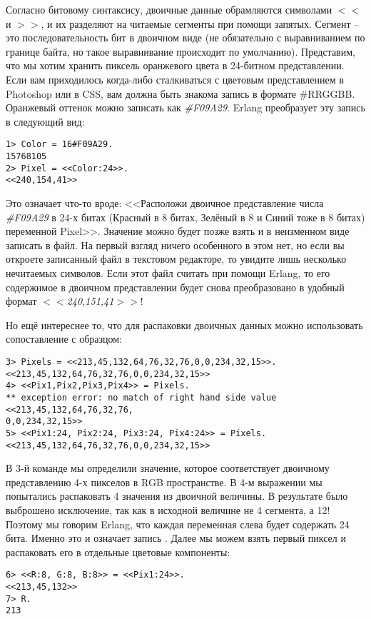 Согласно битовому синтаксису, двоичные данные обрамляются символами $<<$ и $>>$, и их разделяют на читаемые сегменты при помощи запятых. Сегмент \--- это последовательность бит в двоичном виде (не обязательно с выравниванием по границе байта, но такое выравнивание происходит по умолчанию). Представим, что мы хотим хранить пиксель оранжевого цвета в 24\--битном представлении. Если вам приходилось когда\--либо сталкиваться с цветовым представлением в Photoshop или в CSS, вам должна быть знакома запись в формате \#RRGGBB. Оранжевый оттенок можно записать как \emph{\#F09A29}. Erlang преобразует эту запись в следующий вид:
\begin{lstlisting}[style=repl]
1> Color = 16#F09A29.
15768105
2> Pixel = <<Color:24>>.
<<240,154,41>>
\end{lstlisting}

Это означает что\--то вроде: <<Расположи двоичное представление числа \emph{\#F09A29} в 24\--х битах (Красный в 8 битах, Зелёный в 8 и Синий тоже в 8 битах) переменной Pixel>>. Значение можно будет позже взять и в неизменном виде записать в файл. На первый взгляд ничего особенного в этом нет, но если вы откроете записанный файл в текстовом редакторе, то увидите лишь несколько нечитаемых символов. Если этот файл считать при помощи Erlang, то его содержимое в двоичном представлении будет снова преобразовано в удобный формат \emph{$<<$240,151,41$>>$}!

Но ещё интереснее то, что для распаковки двоичных данных можно использовать сопоставление с образцом:
\begin{lstlisting}[style=repl]
3> Pixels = <<213,45,132,64,76,32,76,0,0,234,32,15>>.
<<213,45,132,64,76,32,76,0,0,234,32,15>>
4> <<Pix1,Pix2,Pix3,Pix4>> = Pixels.
** exception error: no match of right hand side value <<213,45,132,64,76,32,76,
0,0,234,32,15>>
5> <<Pix1:24, Pix2:24, Pix3:24, Pix4:24>> = Pixels.
<<213,45,132,64,76,32,76,0,0,234,32,15>>
\end{lstlisting}

В 3\--й команде мы определили значение, которое соответствует двоичному представлению 4\--х пикселов в RGB пространстве. В 4\--м выражении мы попытались распаковать 4 значения из двоичной величины. В результате было выброшено исключение, так как в исходной величине не 4 сегмента, а 12! Поэтому мы говорим Erlang, что каждая переменная слева будет содержать 24 бита. Именно это и означает запись . Далее мы можем взять первый пиксел и распаковать его в отдельные цветовые компоненты:
\begin{lstlisting}[style=repl]
6> <<R:8, G:8, B:8>> = <<Pix1:24>>.
<<213,45,132>>
7> R.
213
\end{lstlisting}

